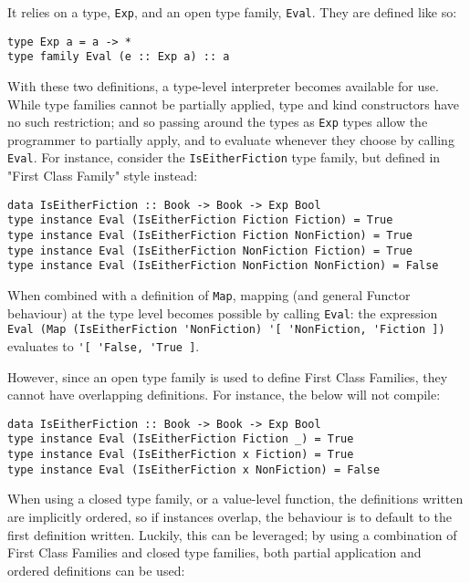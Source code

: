 \documentclass[12pt, a4paper, bibliography=totocnumbered]{scrreprt}
\newcommand{\inline}[1]{\lstinline[basicstyle=\ttfamily\footnotesize]{#1}}
\begin{document}
It relies on a type, \inline{Exp}, and an open type family, \inline{Eval}. They are defined like so:

\begin{lstlisting}
type Exp a = a -> *
type family Eval (e :: Exp a) :: a
\end{lstlisting}

With these two definitions, a type-level interpreter becomes available for use. While type families cannot be partially applied, type and kind constructors have no such restriction; and so passing around the types as \inline{Exp} types allow the programmer to partially apply, and to evaluate whenever they choose by calling \inline{Eval}. For instance, consider the \inline{IsEitherFiction} type family, but defined in "First Class Family" style instead:

\begin{lstlisting}
data IsEitherFiction :: Book -> Book -> Exp Bool
type instance Eval (IsEitherFiction Fiction Fiction) = True
type instance Eval (IsEitherFiction Fiction NonFiction) = True
type instance Eval (IsEitherFiction NonFiction Fiction) = True
type instance Eval (IsEitherFiction NonFiction NonFiction) = False
\end{lstlisting}

When combined with a definition of \inline{Map}, mapping (and general Functor behaviour) at the type level becomes possible by calling \inline{Eval}: the expression \inline{Eval (Map (IsEitherFiction 'NonFiction) '[ 'NonFiction, 'Fiction ])} evaluates to \inline{'[ 'False, 'True ]}.

However, since an open type family is used to define First Class Families, they cannot have overlapping definitions. For instance, the below will not compile:

\begin{lstlisting}
data IsEitherFiction :: Book -> Book -> Exp Bool
type instance Eval (IsEitherFiction Fiction _) = True
type instance Eval (IsEitherFiction x Fiction) = True
type instance Eval (IsEitherFiction x NonFiction) = False
\end{lstlisting}

When using a closed type family, or a value-level function, the definitions written are implicitly ordered, so if instances overlap, the behaviour is to default to the first definition written. Luckily, this can be leveraged; by using a combination of First Class Families and closed type families, both partial application and ordered definitions can be used:
\end{document}
